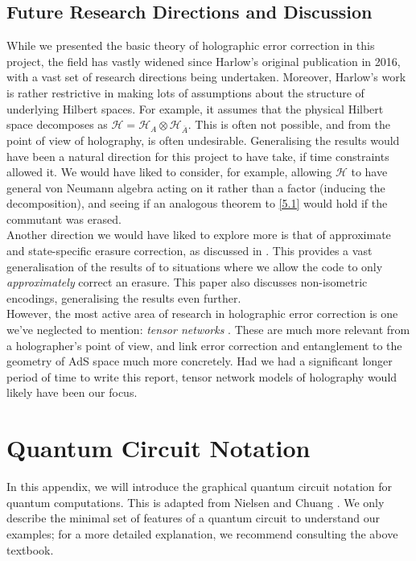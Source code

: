 \documentclass[12pt,a4paper]{report}
\numberwithin{equation}{section}
\newcommand{\ol}[1]{\overline{#1}}
\theoremstyle{definition}
\theoremstyle{theorem}
\theoremstyle{theorem}
\theoremstyle{example}
\theoremstyle{definition}
\begin{document}
\section{Future Research Directions and Discussion}
While we presented the basic theory of holographic error correction in this project, the field has vastly widened since Harlow's original publication in 2016, with a vast set of research directions being undertaken. Moreover, Harlow's work is rather restrictive in making lots of assumptions about the structure of underlying Hilbert spaces. For example, it assumes that the physical Hilbert space decomposes as $\mathcal{H}=\mathcal{H}_{A}\otimes\mathcal{H}_{\ol{A}}$. This is often not possible, and from the point of view of holography, is often undesirable. Generalising the results would have been a natural direction for this project to have take, if time constraints allowed it. We would have liked to consider, for example, allowing $\mathcal{H}$ to have general von Neumann algebra acting on it rather than a factor (inducing the decomposition), and seeing if an analogous theorem to \ref{5.1} would hold if the commutant was erased.\\
Another direction we would have liked to explore more is that of approximate and state-specific erasure correction, as discussed in \cite{QMS}. This provides a vast generalisation of the results of \cite{Harlow} to situations where we allow the code to only \textit{approximately} correct an erasure. This paper also discusses non-isometric encodings, generalising the results even further.\\
However, the most active area of research in holographic error correction is one we've neglected to mention: \textit{tensor networks} \cite{Jahn_2021}. These are much more relevant from a holographer's point of view, and link error correction and entanglement to the geometry of AdS space much more concretely. Had we had a significant longer period of time to write this report, tensor network models of holography would likely have been our focus.\\

\appendix

\chapter{Quantum Circuit Notation}\label{apa}
In this appendix, we will introduce the graphical quantum circuit notation for quantum computations. This is adapted from Nielsen and Chuang \cite{NielsenChuang}. We only describe the minimal set of features of a quantum circuit to understand our examples; for a more detailed explanation, we recommend consulting the above textbook.
\end{document}
